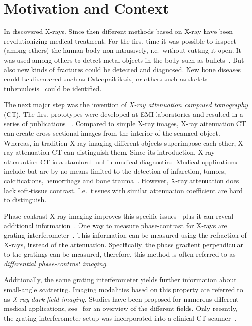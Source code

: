 \chapter{Motivation and Context}\label{chap:introduction}

In \citeyear{rontgen_uber_1895} \citeauthor{rontgen_uber_1895} discovered X-rays. Since then
different methods based on X-ray have been revolutionizing medical treatment. For the first time it
was possible to inspect (among others) the human body non-intrusively, i.e.\ without cutting it
open. It was used among others to detect metal objects in the body such as
bullets~\cite{haygood_skeletal_1996}. But also new kinds of fractures could be detected and
diagnosed. New bone diseases could be discovered such as Osteopoikilosis, or others such as skeletal
tuberculosis~\cite{haygood_skeletal_1996} could be identified.

The next major step was the invention of \textit{X-ray attenuation computed tomography} (CT). The
first prototypes were developed at EMI laboratories and resulted in a series of publications
~\cite{hounsfield_computerized_1973,ambrose_computerized_1973, perry_computerized_1973}. Compared to
simple X-ray images, X-ray attenuation CT can create cross-sectional images from the interior of the
scanned object. Whereas, in tradition X-ray imaging different objects superimpose each other, X-ray
attenuation CT can distinguish them. Since its introduction, X-ray attenuation CT is a standard tool
in medical diagnostics. Medical applications include but are by no means limited to the detection of
infarction, tumors, calcifications, hemorrhage and bone trauma~\cite[Chapter 5]{buchanan_advanced_2012}.
However, X-ray attenuation does lack soft-tissue contrast\cite{pfeiffer_phase_2006}. I.e.\
tissues with similar attenuation coefficient are hard to distinguish.

Phase-contrast X-ray imaging improves this specific issues~\cite{lewis_medical_2004} plus it can
reveal additional information~\cite{hahn_numerical_2012}. One way to measure phase-contrast for
X-rays are grating interferometer~\cite{pfeiffer_hard-x-ray_2008}. This information can be measured
using the refraction of X-rays, instead of the attenuation. Specifically, the phase gradient
perpendicular to the gratings can be measured, therefore, this method is often referred to as
\textit{differential phase-contrast imaging}.

Additionally, the same grating interferometer yields further information about small-angle
scattering. Imaging modalities based on this property are referred to as \textit{X-ray dark-field
	imaging}. Studies have been proposed for numerous different medical applications, see~\cite[Chapter
	1.3.1]{wieczorek_anisotropic_2017} for an overview of the different fields. Only recently, the
grating interferometer setup was incorporated into a clinical CT
scanner~\cite{viermetz_dark-field_2022}.

